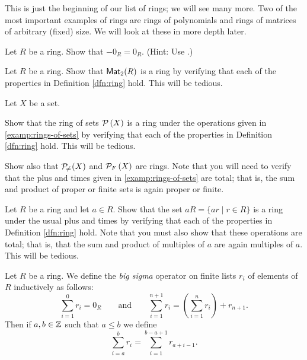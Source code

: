 This is just the beginning of our list of rings; we will see many more.
Two of the most important examples of rings are rings of polynomials and rings of matrices of arbitrary (fixed) size.
We will look at these in more depth later. 



\Exercises%

\begin{exercise}
Let \(R\) be a ring.
Show that \(-0_R = 0_R\).
(Hint: Use .)
\end{exercise}

\begin{exercise}
Let \(R\) be a ring.
Show that \(\mathsf{Mat}_{2}(R)\) is a ring by verifying that each of the properties in Definition \ref{dfn:ring} hold.
This will be tedious.
\end{exercise}

\begin{exercise}
Let \(X\) be a set.
\begin{proplist}
\item Show that the ring of sets \(\mathcal{P}\left(X\right)\) is a ring under the operations given in \ref{examp:rings-of-sets} by verifying that each of the properties in Definition \ref{dfn:ring} hold.
This will be tedious.
\item Show also that \(\mathcal{P}_{\!\neq\!}\left(X\right)\) and \(\mathcal{P}_F\left(X\right)\) are rings.
Note that you will need to verify that the plus and times given in \ref{examp:rings-of-sets} are total; that is, the sum and product of proper or finite sets is again proper or finite.
\end{proplist}
\end{exercise}

\begin{exercise} \label{exerc:aR-is-ring}
Let \(R\) be a ring and let \(a \in R\).
Show that the set \(aR = \{ ar \mid r \in R \}\) is a ring under the usual plus and times by verifying that each of the properties in Definition \ref{dfn:ring} hold.
Note that you must also show that these operations are total; that is, that the sum and product of multiples of \(a\) are again multiples of \(a\).
This will be tedious.
\end{exercise}

\begin{dfn} \label{dfn:big-sigma}
Let \(R\) be a ring.
We define the \emph{big sigma} operator on finite lists \(r_i\) of elements of \(R\) inductively as follows: \[ \sum_{i=1}^0 r_i = 0_R \quad\quad \mathrm{and} \quad\quad \sum_{i=1}^{n+1} r_i = \left( \sum_{i=1}^n r_i \right) + r_{n+1}. \]
Then if \(a,b \in \mathbb{Z}\) such that \(a \leq b\) we define \[ \sum_{i=a}^b r_i = \sum_{i=1}^{b-a+1} r_{a+i-1}. \]
\end{dfn}

